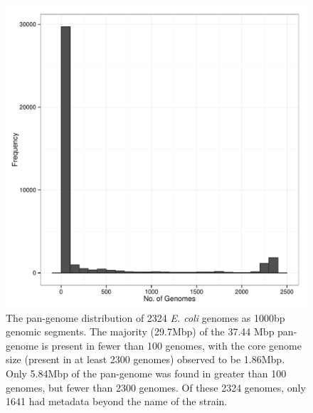 \documentclass[doublespacing, linenumbers]{bmcart}
\begin{document}
\begin{backmatter}
\newpage
\begin{figure}[h!]
  \includegraphics[width=1\columnwidth]{images/panGenomeSize.pdf}
  \caption{The pan-genome distribution of 2324 \textit{E. coli} genomes as 1000bp genomic segments. The majority (29.7Mbp) of the 37.44 Mbp pan-genome is present in fewer than 100 genomes, with the core genome size (present in at least 2300 genomes) observed to be 1.86Mbp. Only 5.84Mbp of the pan-genome was found in greater than 100 genomes, but fewer than 2300 genomes. Of these 2324 genomes, only 1641 had metadata beyond the name of the strain. }
  \label{fig:pan_genome_size}
\end{figure}


\end{backmatter}
\end{document}
